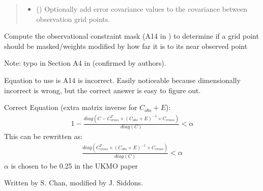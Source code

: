 \documentclass[letterpaper,10pt,english]{sphinxmanual}
\begin{document}
\begin{fulllineitems}
\begin{quote}
\begin{description}
\begin{itemize}
\item {}
\sphinxAtStartPar
{} () \textendash{} Optionally add error covariance values to the covariance between
observation grid points.

\end{itemize}

\end{description}\end{quote}

\begin{fulllineitems}
\label{\detokenize{kriging:glomar_gridding.kriging.SimpleKriging.constraint_mask}}
\pysigstartsignatures
\pysiglinewithargsret
{}
{}
{}
\pysigstopsignatures
\sphinxAtStartPar
Compute the observational constraint mask (A14 in ) to
determine if a grid point should be masked/weights modified by how far
it is to its near observed point

\sphinxAtStartPar
Note: typo in Section A4 in  (confirmed by authors).

\sphinxAtStartPar
Equation to use is A14 is incorrect. Easily noticeable because
dimensionally incorrect is wrong, but the correct answer is easy to
figure out.

\sphinxAtStartPar
Correct Equation (extra matrix inverse for \(C_{obs} + E\)):
\begin{equation*}
\begin{split}1 - \frac{
    diag(C - C_{cross}^T \times (C_{obs} + E)^{-1}
             \times C_{cross})
}{diag(C)} < \alpha\end{split}
\end{equation*}
\sphinxAtStartPar
This can be re\sphinxhyphen{}written as:
\begin{equation*}
\begin{split}\frac{
    diag(C_{cross}^T \times (C_{obs} + E)^{-1} \times C_{cross})
}{diag(C)} < \alpha\end{split}
\end{equation*}
\sphinxAtStartPar
\(\alpha\) is chosen to be 0.25 in the UKMO paper

\sphinxAtStartPar
Written by S. Chan, modified by J. Siddons.


\end{fulllineitems}
\end{fulllineitems}
\end{document}
